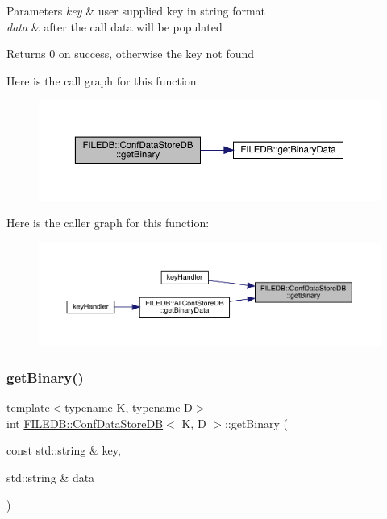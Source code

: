 \begin{DoxyParams}{Parameters}
{\em key} & user supplied key in string format \\
\hline
{\em data} & after the call data will be populated \\
\hline
\end{DoxyParams}
\begin{DoxyReturn}{Returns}
0 on success, otherwise the key not found 
\end{DoxyReturn}
Here is the call graph for this function\+:
\nopagebreak
\begin{figure}[H]
\begin{center}
\leavevmode
\includegraphics[width=350pt]{d8/d19/classFILEDB_1_1ConfDataStoreDB_a971e372585c497dad3b1bc589bc4dd15_cgraph}
\end{center}
\end{figure}
Here is the caller graph for this function\+:
\nopagebreak
\begin{figure}[H]
\begin{center}
\leavevmode
\includegraphics[width=350pt]{d8/d19/classFILEDB_1_1ConfDataStoreDB_a971e372585c497dad3b1bc589bc4dd15_icgraph}
\end{center}
\end{figure}
\mbox{\label{classFILEDB_1_1ConfDataStoreDB_a971e372585c497dad3b1bc589bc4dd15}} 
\subsubsection{\texorpdfstring{getBinary()}{getBinary()}\hspace{0.1cm}{\footnotesize\ttfamily [2/3]}}
{\footnotesize\ttfamily template$<$typename K, typename D$>$ \\
int \mbox{\hyperlink{classFILEDB_1_1ConfDataStoreDB}{F\+I\+L\+E\+D\+B\+::\+Conf\+Data\+Store\+DB}}$<$ K, D $>$\+::get\+Binary (\begin{DoxyParamCaption}\item[{const std\+::string \&}]{key,  }\item[{std\+::string \&}]{data }\end{DoxyParamCaption})\hspace{0.3cm}{\ttfamily [inline]}}

